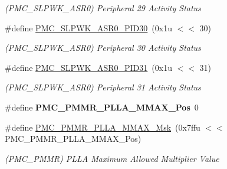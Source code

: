 \begin{DoxyCompactItemize}
\begin{DoxyCompactList}\small\item\em (P\+M\+C\+\_\+\+S\+L\+P\+W\+K\+\_\+\+A\+S\+R0) Peripheral 29 Activity Status \end{DoxyCompactList}\item 
\mbox{\label{group__SAMV71__PMC_gafdc5a98b12be110e23239c61caa66d52}} 
\#define \mbox{\hyperlink{group__SAMV71__PMC_gafdc5a98b12be110e23239c61caa66d52}{P\+M\+C\+\_\+\+S\+L\+P\+W\+K\+\_\+\+A\+S\+R0\+\_\+\+P\+I\+D30}}~(0x1u $<$$<$ 30)
\begin{DoxyCompactList}\small\item\em (P\+M\+C\+\_\+\+S\+L\+P\+W\+K\+\_\+\+A\+S\+R0) Peripheral 30 Activity Status \end{DoxyCompactList}\item 
\mbox{\label{group__SAMV71__PMC_gab23c1221c3773c42011247533325c5f7}} 
\#define \mbox{\hyperlink{group__SAMV71__PMC_gab23c1221c3773c42011247533325c5f7}{P\+M\+C\+\_\+\+S\+L\+P\+W\+K\+\_\+\+A\+S\+R0\+\_\+\+P\+I\+D31}}~(0x1u $<$$<$ 31)
\begin{DoxyCompactList}\small\item\em (P\+M\+C\+\_\+\+S\+L\+P\+W\+K\+\_\+\+A\+S\+R0) Peripheral 31 Activity Status \end{DoxyCompactList}\item 
\mbox{\label{group__SAMV71__PMC_ga4b43c410ef9a91d3a80ddfb37620a98d}} 
\#define {\bfseries P\+M\+C\+\_\+\+P\+M\+M\+R\+\_\+\+P\+L\+L\+A\+\_\+\+M\+M\+A\+X\+\_\+\+Pos}~0
\item 
\mbox{\label{group__SAMV71__PMC_ga953c032e7a1789cfd1c988f1b8714fe3}} 
\#define \mbox{\hyperlink{group__SAMV71__PMC_ga953c032e7a1789cfd1c988f1b8714fe3}{P\+M\+C\+\_\+\+P\+M\+M\+R\+\_\+\+P\+L\+L\+A\+\_\+\+M\+M\+A\+X\+\_\+\+Msk}}~(0x7ffu $<$$<$ P\+M\+C\+\_\+\+P\+M\+M\+R\+\_\+\+P\+L\+L\+A\+\_\+\+M\+M\+A\+X\+\_\+\+Pos)
\begin{DoxyCompactList}\small\item\em (P\+M\+C\+\_\+\+P\+M\+MR) P\+L\+LA Maximum Allowed Multiplier Value \end{DoxyCompactList}\item 
\mbox{\label{group__SAMV71__PMC_ga13800fa5e46659c40a881c5e77a30fb7}} 
$$
\end{DoxyCompactItemize}
